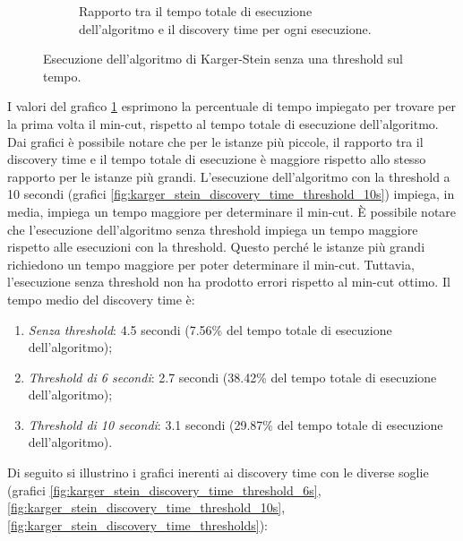 \begin{figure}[H]
\begin{subfigure}{.5\textwidth}
		\caption{Rapporto tra il tempo totale di esecuzione dell'algoritmo 
		e il discovery time per ogni esecuzione.}
		\label{fig:karger_stein_rapporto_discovery_time_total_time}
	\end{subfigure}
	\caption{Esecuzione dell'algoritmo di Karger-Stein senza una threshold sul tempo.}
	\label{fig:karger_stein_discovery_time}
\end{figure}

I valori del grafico \ref{fig:karger_stein_rapporto_discovery_time_total_time} 
esprimono la percentuale di tempo impiegato per trovare per la prima 
volta il min-cut, rispetto al tempo totale di esecuzione dell'algoritmo.
Dai grafici è possibile notare che per le istanze più piccole, il rapporto 
tra il discovery time e il tempo totale di esecuzione è maggiore rispetto 
allo stesso rapporto per le istanze più grandi.
L'esecuzione dell'algoritmo con la threshold a 10 secondi (grafici 
\ref{fig:karger_stein_discovery_time_threshold_10s}) impiega, in media, 
impiega un tempo maggiore per determinare il min-cut. È possibile notare che 
l'esecuzione dell'algoritmo senza threshold impiega un tempo maggiore rispetto 
alle esecuzioni con la threshold. Questo perché le istanze più grandi richiedono 
un tempo maggiore per poter determinare il min-cut. Tuttavia, l'esecuzione senza 
threshold non ha prodotto errori rispetto al min-cut ottimo. Il tempo medio del 
discovery time è:
\begin{enumerate}
	\item \textit{Senza threshold}: 4.5 secondi (7.56\% del tempo totale di 
	esecuzione dell'algoritmo);
	\item \textit{Threshold di 6 secondi}: 2.7 secondi (38.42\% del tempo totale di 
	esecuzione dell'algoritmo);
	\item \textit{Threshold di 10 secondi}: 3.1 secondi (29.87\% del tempo totale di 
	esecuzione dell'algoritmo).
\end{enumerate}

Di seguito si illustrino i grafici inerenti ai discovery time con le diverse soglie 
(grafici \ref{fig:karger_stein_discovery_time_threshold_6s}, 
\ref{fig:karger_stein_discovery_time_threshold_10s}, 
\ref{fig:karger_stein_discovery_time_thresholds}):

